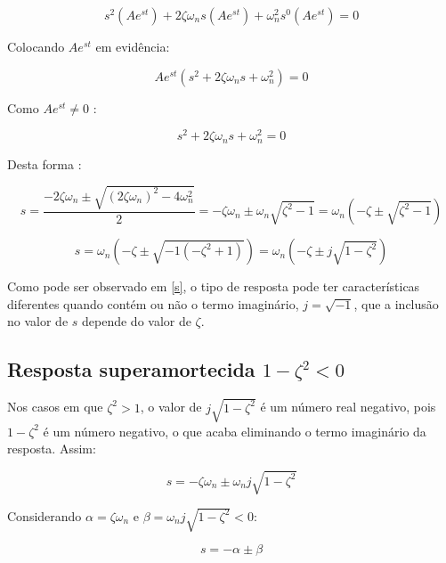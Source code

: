\documentclass[12pt,fleqn]{book} %
\begin{document}
{\begin{equation}
s^2(Ae^{st}) + 2\zeta\omega_ns(Ae^{st}) + \omega_n^2s^0(Ae^{st}) = 0
\end{equation}

Colocando $Ae^{st}$ em evidência:

\begin{equation}
Ae^{st}(s^2 + 2\zeta\omega_ns + \omega_n^2) = 0
\end{equation}

Como $Ae^{st} \neq 0$ :

\begin{equation}
s^2 + 2\zeta\omega_ns + \omega_n^2 = 0
\end{equation}

Desta forma :

\begin{equation}
s = \frac{-2\zeta\omega_n\pm\sqrt{(2\zeta\omega_n)^2-4\omega_n^2}}{2} = -\zeta\omega_n \pm \omega_n\sqrt{\zeta^2-1} = \omega_n(-\zeta\pm\sqrt{\zeta^2-1})
\end{equation}

\begin{equation}\label{s}
s = \omega_n(-\zeta\pm\sqrt{-1(-\zeta^2+1)}) = \omega_n(-\zeta\pm j\sqrt{1-\zeta^2})
\end{equation}

Como pode ser observado em \ref{s}, o tipo de resposta pode ter características diferentes quando contém ou não o termo imaginário, $j = \sqrt{-1}$, que a inclusão no valor de $s$ depende do valor de $\zeta$.

\subsection{Resposta superamortecida $1-\zeta^2 < 0$}

Nos casos em que $\zeta^2 > 1$, o valor de $j\sqrt{1-\zeta^2}$ é um número real negativo, pois $1-\zeta^2$ é um número negativo, o que acaba eliminando o termo imaginário da resposta. Assim:

\begin{equation}
s = -\zeta\omega_n \pm \omega_nj\sqrt{1-\zeta^2}
\end{equation}

Considerando $\alpha = \zeta\omega_n$ e $\beta = \omega_nj\sqrt{1-\zeta^2} < 0$:

\begin{equation}
s = -\alpha \pm \beta
\end{equation}

}
\end{document}
